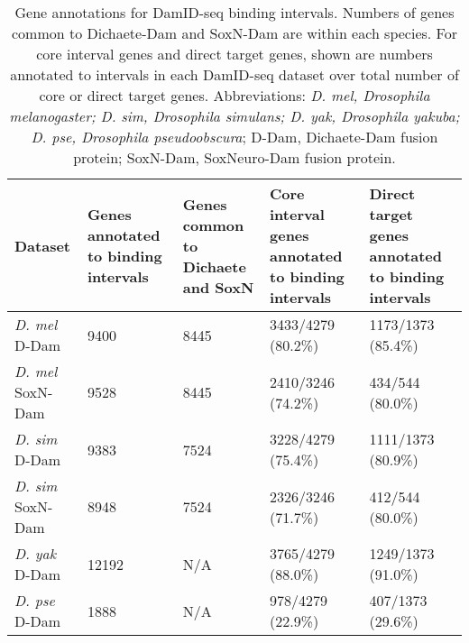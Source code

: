 \begin{table}[h]
\centering
\begin{tabular}{|l|p{2cm}|p{2cm}|p{2.5cm}|p{2.5cm}|}
\hline
\textbf{Dataset}         & \textbf{Genes annotated to binding intervals} & \textbf{Genes common to Dichaete and SoxN} & \textbf{Core interval genes annotated to binding intervals} & \textbf{Direct target genes annotated to binding intervals} \\ \hline
\emph{D. mel} D-Dam    & 9400                                 & 8445                              & 3433/4279 (80.2\%)                                 & 1173/1373 (85.4\%)                                 \\ \hline
\emph{D. mel} SoxN-Dam & 9528                                 & 8445                              & 2410/3246 (74.2\%)                                 & 434/544 (80.0\%)                                   \\ \hline
\emph{D. sim} D-Dam    & 9383                                 & 7524                              & 3228/4279 (75.4\%)                                 & 1111/1373 (80.9\%)                                 \\ \hline
\emph{D. sim} SoxN-Dam & 8948                                 & 7524                              & 2326/3246 (71.7\%)                                 & 412/544 (80.0\%)                                   \\ \hline
\emph{D. yak} D-Dam    & 12192                                & N/A                               & 3765/4279 (88.0\%)                                 & 1249/1373 (91.0\%)                                 \\ \hline
\emph{D. pse} D-Dam    & 1888                                 & N/A                               & 978/4279 (22.9\%)                                  & 407/1373 (29.6\%)                                  \\ \hline
\end{tabular}
\caption{Gene annotations for DamID-seq binding intervals. Numbers of genes common to Dichaete-Dam and SoxN-Dam are within each species. For core interval genes and direct target genes, shown are numbers annotated to intervals in each DamID-seq dataset over total number of core or direct target genes. Abbreviations: \emph{D. mel, Drosophila melanogaster; D. sim, Drosophila simulans; D. yak, Drosophila yakuba; D. pse, Drosophila pseudoobscura}; D-Dam, Dichaete-Dam fusion protein; SoxN-Dam, SoxNeuro-Dam fusion protein.}
\label{Table 4.8}
\end{table}

